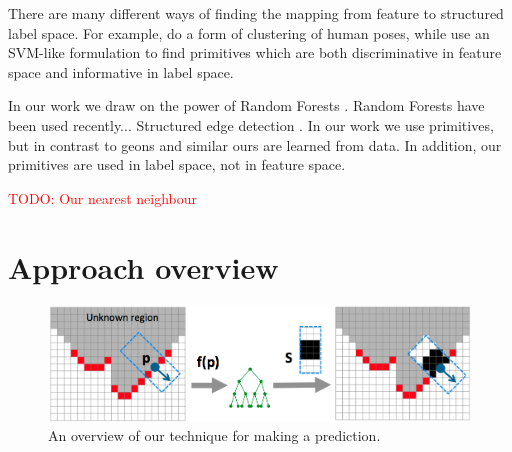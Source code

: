 \documentclass[10pt,twocolumn,letterpaper]{article}
\newcommand{\todo}[1]{\textcolor{red}{TODO: #1}}
\begin{document}
There are many different ways of finding the mapping from feature to structured label space.
For example, \cite{bourdev-iccv-2009} do a form of clustering of human poses, while \cite{fouhey-iccv-2013} use an SVM-like formulation to find primitives which are both discriminative in feature space and informative in label space.

In our work we draw on the power of Random Forests \cite{}.
Random Forests have been used recently...
Structured edge detection \cite{dollar-iccv-2013}.
In our work we use primitives, but in contrast to geons and similar ours are learned from data.
In addition, our primitives are used in label space, not in feature space.


\todo{Our nearest neighbour}





\section{Approach overview}



\begin{figure}[tb]
    \includegraphics[width=2.0\columnwidth]{overview}
    \caption{
    An overview of our technique for making a prediction. 
    }%
    \label{fig:overview}
\end{figure}
\end{document}
